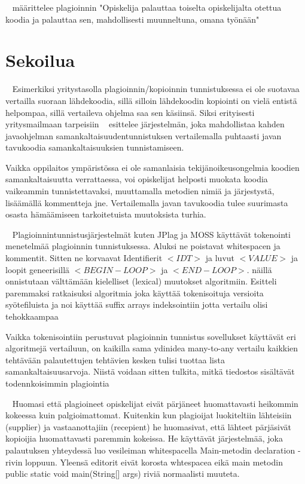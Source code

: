 \documentclass[finnish]{../tktltiki2}
\theoremstyle{definition}
\theoremstyle{remark}
\begin{document}
~\cite{Daly:2005:PP:1047124.1047473} määrittelee plagioinnin "Opiskelija palauttaa toiselta opiskelijalta otettua koodia ja palauttaa sen, mahdollisesti muunneltuna, omana työnään"


\section{Sekoilua}
~\cite{4682179}
Esimerkiksi yritystasolla plagioinnin/kopioinnin tunnistuksessa ei ole suotavaa vertailla suoraan lähdekoodia, sillä silloin lähdekoodin kopiointi on vielä entistä helpompaa, sillä vertaileva ohjelma saa sen käsiinsä. Siksi erityisesti yritysmailmaan tarpeisiin ~\cite{4682179} esittelee järjestelmän, joka mahdollistaa kahden javaohjelman samankaltaisuudentunnistuksen vertailemalla puhtaasti javan tavukoodia samankaltaisuuksien tunnistamiseen.

Vaikka oppilaitos ympäristössa ei ole samanlaisia tekijänoikeusongelmia koodien samankaltaisuutta verrattaessa, voi opiskelijat helposti muokata koodia vaikeammin tunnistettavaksi, muuttamalla metodien nimiä ja järjestystä, lisäämällä kommentteja jne. Vertailemalla javan tavukoodia tulee suurimasta osasta hämäämiseen tarkoitetuista muutoksista turhia.



~\cite{FPDS}
Plagioinnintunnistusjärjestelmät kuten JPlag ja MOSS käyttävät tokenointi menetelmää plagioinnin tunnistuksessa. Aluksi ne poistavat whitespacen ja kommentit. Sitten ne korvaavat Identifierit $<IDT>$ ja luvut $<VALUE>$ ja loopit geneerisillä $<BEGIN-LOOP>$ ja $<END-LOOP>$. näillä onnistutaan välttämään kielelliset (lexical) muutokset algoritmiin.
Esitteli paremmaksi ratkaisuksi algoritmia joka käyttää tokenisoituja versioita syötefiluista ja noi käyttää suffix arrays indeksointiin jotta vertailu olisi tehokkaampaa %


Vaikka tokenisointiin perustuvat plagioinnin tunnistus sovellukset käyttävät eri algoritmejä vertailuun, on kaikilla sama ydinidea
many-to-any vertailu kaikkien tehtävään palautettujen tehtävien kesken tulisi tuottaa lista samankaltaisuusarvoja. Niistä voidaan sitten tulkita, mitkä tiedostos sisältävät todennkoisimmin plagiointia

~\cite{Daly:2005:PP:1047124.1047473}
Huomasi että plagioineet opiskelijat eivät pärjäneet huomattavasti heikommin kokeessa kuin palgioimattomat. Kuitenkin kun plagioijat luokiteltiin lähteisiin (supplier) ja vastaanottajiin (recepient) he huomasivat, että lähteet pärjäsivät kopioijia huomattavasti paremmin kokeissa.
He käyttävät järjestelmää, joka palautuksen yhteydessä luo vesileiman whitespacella Main-metodin declaration -rivin loppuun. Yleensä editorit eivät korosta whtespacea eikä main metodin public static void main(String[] args) riviä normaalisti muuteta.
\end{document}
